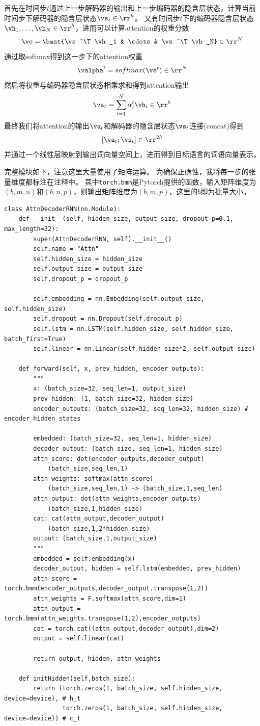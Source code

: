 \documentclass[logo,reportComp]{thesis}
\let\emph\relax %
\begin{document}
首先在时间步$t$通过上一步解码器的输出和上一步编码器的隐含层状态，计算当前时间步下解码器的隐含层状态$\vs_t\in\rr^h$。
又有时间步$t$下的编码器隐含层状态$\vh_1,\ldots,\vh_N\in\rr^h$，进而可以计算attention的权重分数
\[\ve=\bmat{\vs^\T\vh_1 & \cdots & \vs^\T\vh_N}\in\rr^N\]
通过取softmax得到这一步下的attention权重
\[\valpha^t=softmax(\ve^t)\in\rr^N\]
然后将权重与编码器隐含层状态相乘求和得到attention输出
\[\va_t=\sum_{i=1}^N\alpha^t_i\vh_i\in\rr^h\]
最终我们将attention的输出$\va_t$和解码器的隐含层状态$\vs_t$连接(concat)得到
\[[\va_t;\vs_t]\in\rr^{2h}\]
并通过一个线性层映射到输出词向量空间上，进而得到目标语言的词语向量表示。

完整模块如下，注意这里大量使用了矩阵运算。
为确保正确性，我将每一步的张量维度都标注在注释中。
其中\verb'torch.bmm'是Pytorch提供的\emph{批矩阵乘}函数，输入矩阵维度为$(b,m,n)$和$(b,n,p)$，则输出矩阵维度为$(b,m,p)$，这里的$b$即为批量大小。
\begin{lstlisting}
class AttnDecoderRNN(nn.Module):
    def __init__(self, hidden_size, output_size, dropout_p=0.1, max_length=32):
        super(AttnDecoderRNN, self).__init__()
        self.name = "Attn"
        self.hidden_size = hidden_size
        self.output_size = output_size
        self.dropout_p = dropout_p

        self.embedding = nn.Embedding(self.output_size, self.hidden_size)
        self.dropout = nn.Dropout(self.dropout_p)
        self.lstm = nn.LSTM(self.hidden_size, self.hidden_size, batch_first=True)
        self.linear = nn.Linear(self.hidden_size*2, self.output_size)

    def forward(self, x, prev_hidden, encoder_outputs):
        """
        x: (batch_size=32, seq_len=1, output_size)
        prev_hidden: (1, batch_size=32, hidden_size)
        encoder_outputs: (batch_size=32, seq_len=32, hidden_size) # encoder hidden states

        embedded: (batch_size=32, seq_len=1, hidden_size)
        decoder_output: (batch_size, seq_len=1, hidden_size)
        attn_score: dot(encoder_outputs,decoder_output)
            (batch_size,seq_len,1)
        attn_weights: softmax(attn_score)
            (batch_size,seq_len,1) -> (batch_size,1,seq_len)
        attn_output: dot(attn_weights,encoder_outputs)
            (batch_size,1,hidden_size)
        cat: cat(attn_output,decoder_output)
            (batch_size,1,2*hidden_size)
        output: (batch_size,1,output_size)
        """
        embedded = self.embedding(x)
        decoder_output, hidden = self.lstm(embedded, prev_hidden)
        attn_score = torch.bmm(encoder_outputs,decoder_output.transpose(1,2))
        attn_weights = F.softmax(attn_score,dim=1)
        attn_output = torch.bmm(attn_weights.transpose(1,2),encoder_outputs)
        cat = torch.cat((attn_output,decoder_output),dim=2)
        output = self.linear(cat)

        return output, hidden, attn_weights

    def initHidden(self,batch_size):
        return (torch.zeros(1, batch_size, self.hidden_size, device=device), # h_t
                torch.zeros(1, batch_size, self.hidden_size, device=device)) # c_t
\end{lstlisting}
\end{document}
